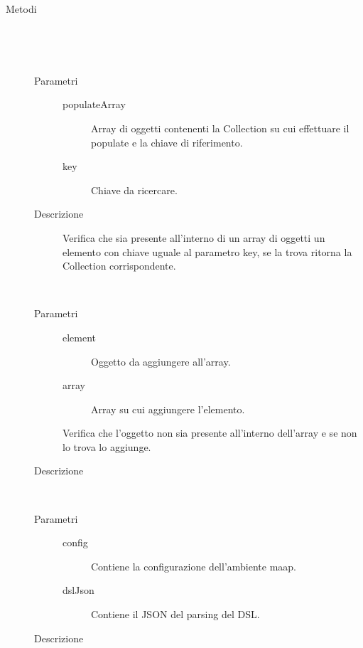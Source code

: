 \begin{description}
 \item[Metodi] \hfill \\
 \begin{mldescription}
  \hfill \\ 
 \begin{description}
      		\item[Parametri] \hfill
      			\begin{description}
      				\item[populateArray]
      				Array di oggetti contenenti la Collection su cui effettuare il populate e la chiave di riferimento.
      				\item[key]
      				Chiave da ricercare.
      			\end{description}
      		\item[Descrizione]
      		Verifica che sia presente all'interno di un array di oggetti un elemento con chiave uguale al parametro key, se la trova ritorna la Collection corrispondente.
    \end{description}
  \hfill \\ 
 \begin{description}
      		\item[Parametri] \hfill
      			\begin{description}
      				\item[element]
      				Oggetto da aggiungere all'array.
      			   	\item[array]
      			   	Array su cui aggiungere l'elemento.
      			\end{description}
      			Verifica che l'oggetto non sia presente all'interno dell'array e se non lo trova lo aggiunge.
      		\item[Descrizione]
    \end{description}
  \hfill \\ 
 \begin{description}
      		\item[Parametri] \hfill
      			\begin{description}
      				\item[config]
      				Contiene la configurazione dell'ambiente maap.
      				\item[dslJson]
      				Contiene il JSON del parsing del DSL.
      			\end{description}
      		\item[Descrizione]
    \end{description}
 \end{mldescription}
 
\end{description}

